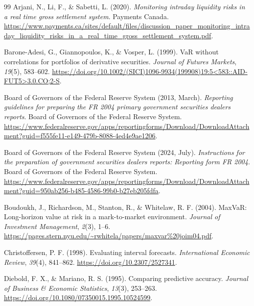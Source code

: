 \begin{thebibliography}{99}
 Arjani, N., Li, F., \& Sabetti, L. (2020). \emph{Monitoring intraday liquidity risks in a real time gross settlement system}. Payments Canada. \url{https://www.payments.ca/sites/default/files/discussion_paper_monitoring_intraday_liquidity_risks_in_a_real_time_gross_settlement_system.pdf}.

 Barone-Adesi, G., Giannopoulos, K., \& Vosper, L. (1999). VaR without correlations for portfolios of derivative securities. \emph{Journal of Futures Markets}, \emph{19}(5), 583--602. \url{https://doi.org/10.1002/(SICI)1096-9934(199908)19:5<583::AID-FUT5>3.0.CO;2-S}.

 Board of Governors of the Federal Reserve System (2013, March). \emph{Reporting guidelines for preparing the FR 2004 primary government securities dealers reports}. Board of Governors of the Federal Reserve System. \url{https://www.federalreserve.gov/apps/reportingforms/Download/DownloadAttachment?guid=f555fe11-e149-479b-8088-4ed4e9ae1206}.

 Board of Governors of the Federal Reserve System (2024, July). \emph{Instructions for the preparation of government securities dealers reports: Reporting form FR 2004}. Board of Governors of the Federal Reserve System. \url{https://www.federalreserve.gov/apps/reportingforms/Download/DownloadAttachment?guid=950ab256-b485-4586-99b0-b27eb205fdfa}.

 Boudoukh, J., Richardson, M., Stanton, R., \& Whitelaw, R. F. (2004). MaxVaR: Long-horizon value at risk in a mark-to-market environment. \emph{Journal of Investment Management}, \emph{2}(3), 1--6. \url{https://pages.stern.nyu.edu/~rwhitela/papers/maxvar%20joim04.pdf}.

 Christoffersen, P. F. (1998). Evaluating interval forecasts. \emph{International Economic Review}, \emph{39}(4), 841--862. \url{https://doi.org/10.2307/2527341}.

 Diebold, F. X., \& Mariano, R. S. (1995). Comparing predictive accuracy. \emph{Journal of Business \& Economic Statistics}, \emph{13}(3), 253--263. \url{https://doi.org/10.1080/07350015.1995.10524599}.


\end{thebibliography}
